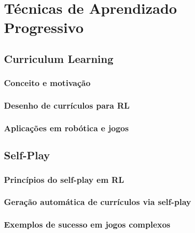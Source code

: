 \section{Técnicas de Aprendizado Progressivo}
\label{sec:aprendizado_prog}

\subsection{Curriculum Learning}
\label{subsec:curriculum}

\subsubsection{Conceito e motivação}
\label{subsubsec:curriculum_conceito}

\subsubsection{Desenho de currículos para RL}
\label{subsubsec:curriculum_desenho}

\subsubsection{Aplicações em robótica e jogos}
\label{subsubsec:curriculum_aplicacoes}

\subsection{Self-Play}
\label{subsec:self_play}

\subsubsection{Princípios do self-play em RL}
\label{subsubsec:self_play_principios}

\subsubsection{Geração automática de currículos via self-play}
\label{subsubsec:self_play_curriculos}

\subsubsection{Exemplos de sucesso em jogos complexos}
\label{subsubsec:self_play_exemplos}

